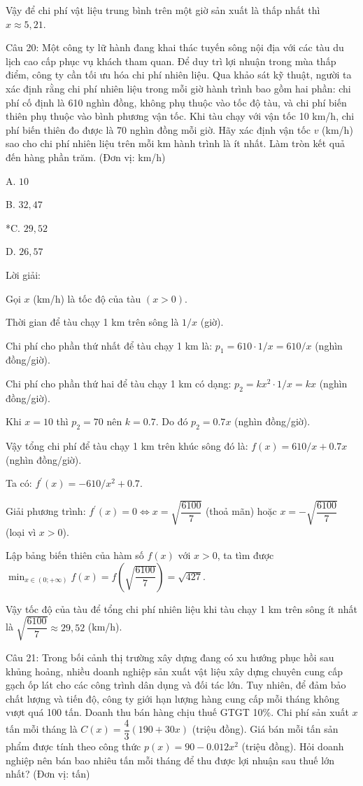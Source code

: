 \documentclass[a4paper,12pt]{article}
\begin{document}
Vậy để chi phí vật liệu trung bình trên một giờ sản xuất là thấp nhất thì \(x \approx 5,21\).




Câu 20: Một công ty lữ hành đang khai thác tuyến sông nội địa với các tàu du lịch cao cấp phục vụ khách tham quan. Để duy trì lợi nhuận trong mùa thấp điểm, công ty cần tối ưu hóa chi phí nhiên liệu. Qua khảo sát kỹ thuật, người ta xác định rằng chi phí nhiên liệu trong mỗi giờ hành trình bao gồm hai phần: chi phí cố định là 610 nghìn đồng, không phụ thuộc vào tốc độ tàu, và chi phí biến thiên phụ thuộc vào bình phương vận tốc. Khi tàu chạy với vận tốc 10 km/h, chi phí biến thiên đo được là 70 nghìn đồng mỗi giờ. Hãy xác định vận tốc \(v\) (km/h) sao cho chi phí nhiên liệu trên mỗi km hành trình là ít nhất. Làm tròn kết quả đến hàng phần trăm. (Đơn vị: km/h)

A. \(10\)

B. \(32,47\)

*C. \(29,52\)

D. \(26,57\)

Lời giải:


Gọi \(x\) (km/h) là tốc độ của tàu \((x > 0)\).

Thời gian để tàu chạy 1 km trên sông là \(1/x\) (giờ).

Chi phí cho phần thứ nhất để tàu chạy 1 km là: \(p_1=610 \cdot 1/x=610/x\) (nghìn đồng/giờ).

Chi phí cho phần thứ hai để tàu chạy 1 km có dạng: \(p_2=k x^2 \cdot 1/x=k x\) (nghìn đồng/giờ).

Khi \(x=10\) thì \(p_2=70\) nên \(k=0.7\). Do đó \(p_2=0.7 x\) (nghìn đồng/giờ).

Vậy tổng chi phí để tàu chạy 1 km trên khúc sông đó là: \(f(x)=610/x+0.7 x\) (nghìn đồng/giờ).

Ta có: \(f^{\prime}(x)=-610/x^2+0.7\).

        Giải phương trình: \(f^{\prime}(x)=0 \Leftrightarrow x=\sqrt{\dfrac{6100}{7}}\) (thoả mãn) hoặc \(x=-\sqrt{\dfrac{6100}{7}}\) (loại vì \(x>0\)).

        Lập bảng biến thiên của hàm số \(f(x)\) với \(x>0\), ta tìm được \(\min_{x \in(0 ;+\infty)} f(x)=f(\sqrt{\dfrac{6100}{7}})=\sqrt{427}\).

        Vậy tốc độ của tàu để tổng chi phí nhiên liệu khi tàu chạy 1 km trên sông ít nhất là \(\sqrt{\dfrac{6100}{7}} \approx 29,52\) (km/h).




Câu 21: Trong bối cảnh thị trường xây dựng đang có xu hướng phục hồi sau khủng hoảng, nhiều doanh nghiệp sản xuất vật liệu xây dựng chuyên cung cấp gạch ốp lát cho các công trình dân dụng và đối tác lớn. Tuy nhiên, để đảm bảo chất lượng và tiến độ, công ty giới hạn lượng hàng cung cấp mỗi tháng không vượt quá 100 tấn. Doanh thu bán hàng chịu thuế GTGT 10\%. Chi phí sản xuất \(x\) tấn mỗi tháng là \(C(x) = \dfrac{4}{3}(190 + 30x)\) (triệu đồng). Giá bán mỗi tấn sản phẩm được tính theo công thức \(p(x) = 90 - 0.012x^2\) (triệu đồng). Hỏi doanh nghiệp nên bán bao nhiêu tấn mỗi tháng để thu được lợi nhuận sau thuế lớn nhất? (Đơn vị: tấn)
\end{document}
